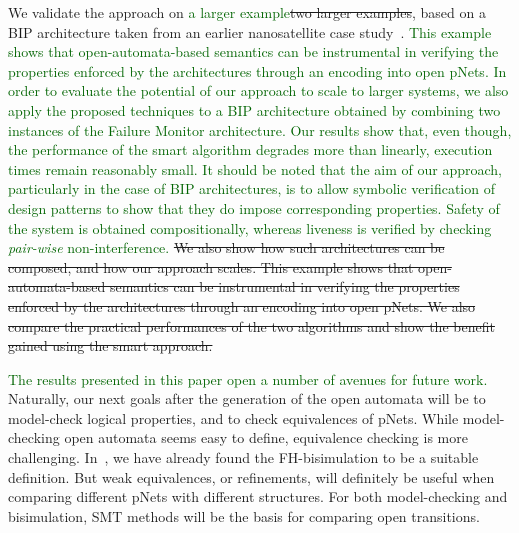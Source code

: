 \documentclass[smallcondensed]{svjour3}
\newcommand{\Simon}[1]{\textcolor{darkgreen}{#1}}
\begin{document}
We validate the approach on \Simon{a larger example}\st{two larger examples}, 
based on a BIP architecture taken from an earlier nanosatellite case
study~\cite{CubETH-case-study}.  \Simon{This example shows that
open-automata-based semantics can be instrumental in verifying the
properties enforced by the architectures through an encoding into open
pNets.
In order to evaluate the potential
%
of our approach to scale to larger systems, we also apply the proposed
techniques to a BIP architecture obtained by combining two instances
of the Failure Monitor architecture.  Our results show that, even
though, the performance of the smart algorithm degrades more than
linearly, execution times remain reasonably small.  It should be noted
that the aim of our approach, particularly in the case of BIP
architectures, is to allow symbolic verification of design patterns to
show that they do impose corresponding properties. Safety of the system is obtained compositionally, whereas liveness is verified by checking \emph{pair-wise} non-interference.
%
}\st{We also show how such architectures
can be composed, and how our approach scales.
This example shows that
open-automata-based semantics can be instrumental in verifying the
properties enforced by the architectures through an encoding into open
pNets.
We also compare the practical performances of the two algorithms and
show the benefit gained using the smart approach.}

\Simon{The results presented in this paper open a number of avenues
  for future work.}
%
Naturally, our next goals after the generation of the open automata
will be to model-check logical properties, and to check equivalences
of pNets. While model-checking open automata seems easy to define,
equivalence checking is more challenging. 
In~\cite{henrio:Forte2016}, we
have already found the FH-bisimulation 
to be a suitable definition. But weak equivalences, or refinements, will
definitely be useful when comparing different pNets with
different structures. For both model-checking and bisimulation, SMT methods
will be the basis for comparing open transitions. 
\end{document}
